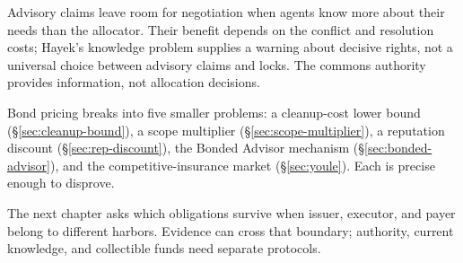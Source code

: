 \documentclass[11pt,a4paper]{article}
\theoremstyle{definition}
\theoremstyle{remark}
\begin{document}
Advisory claims leave room for negotiation when agents know more about
their needs than the allocator. Their benefit depends on the conflict and
resolution costs; Hayek's knowledge problem supplies a warning about
decisive rights, not a universal choice between advisory claims and locks. The commons authority provides information, not allocation decisions.

Bond pricing breaks into five smaller problems: a cleanup-cost lower bound (\S\ref{sec:cleanup-bound}), a scope multiplier (\S\ref{sec:scope-multiplier}), a reputation discount (\S\ref{sec:rep-discount}), the Bonded Advisor mechanism (\S\ref{sec:bonded-advisor}), and the competitive-insurance market (\S\ref{sec:youle}). Each is precise enough to disprove.

The next chapter asks which obligations survive when issuer, executor, and
payer belong to different harbors. Evidence can cross that boundary;
authority, current knowledge, and collectible funds need separate protocols.
\end{document}
